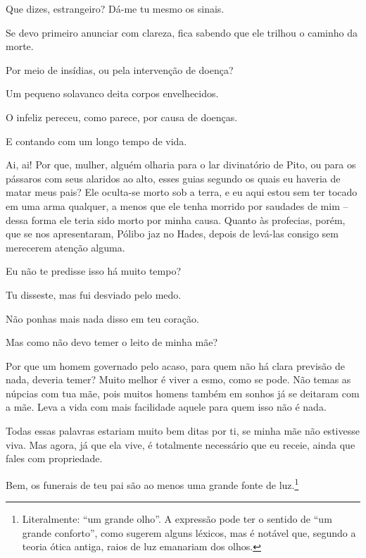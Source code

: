    Que dizes, estrangeiro? Dá-me tu mesmo os sinais.

   Se devo primeiro anunciar com clareza, fica sabendo que ele trilhou o
caminho da morte.

   Por meio de insídias, ou pela intervenção de doença?

   Um pequeno solavanco deita corpos envelhecidos.

   O infeliz pereceu, como parece, por causa de doenças.

   E contando com um longo tempo de vida.

   Ai, ai! Por que, mulher, alguém olharia para o lar divinatório de Pito,
ou para os pássaros com seus alaridos ao alto, esses guias segundo os
quais eu haveria de matar meus pais? Ele oculta-se morto sob a terra, e
eu aqui estou sem ter tocado em uma arma qualquer, a menos que ele tenha
morrido por saudades de mim -- dessa forma ele teria sido morto por
minha causa. Quanto às profecias, porém, que se nos apresentaram, Pólibo
jaz no Hades, depois de levá-las consigo sem merecerem atenção alguma.

   Eu não te predisse isso há muito tempo?

   Tu disseste, mas fui desviado pelo medo.

   Não ponhas mais nada disso em teu coração.

   Mas como não devo temer o leito de minha mãe?

   Por que um homem governado pelo acaso, para quem não há clara previsão
de nada, deveria temer? Muito melhor é viver a esmo, como se pode. Não
temas as núpcias com tua mãe, pois muitos homens também em sonhos
já se deitaram com a mãe. Leva a vida com mais facilidade aquele para
quem isso não é nada.

   Todas essas palavras estariam muito bem ditas por ti, se minha mãe não
estivesse viva. Mas agora, já que ela vive, é totalmente necessário que
eu receie, ainda que fales com propriedade.

   Bem, os funerais de teu pai são ao menos uma grande fonte de
luz.\footnote{Literalmente: ``um grande olho''. A expressão pode ter o
  sentido de ``um grande conforto'', como sugerem alguns léxicos, mas é
  notável que, segundo a teoria ótica antiga, raios de luz emanariam dos
  olhos.}

